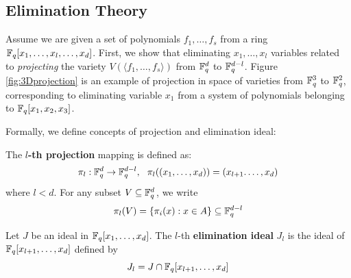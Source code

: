 \subsection{Elimination Theory}
Assume we are given a set of polynomials $f_1,\dots,f_s$ from a ring ${\mathbb{F}}_{q}[x_1,\dots,x_l,\dots,x_d]$.
First, we show that eliminating $x_1,\dots,x_l$ variables related to 
{\it projecting} the variety $V(\langle f_1,\dots,f_s\rangle)$ from 
${\mathbb{F}}_{q}^d$ to ${\mathbb{F}}_{q}^{d-l}$. Figure \ref{fig:3Dprojection} is an example of projection in space of varieties
from ${\mathbb{F}}_{q}^3$ to ${\mathbb{F}}_{q}^2$, corresponding to eliminating variable $x_1$ from 
a system of polynomials belonging to ${\mathbb{F}}_{q}[x_1,x_2,x_3]$.

\begin{figure}[bp]
\end{figure}

Formally, we define concepts of projection and elimination ideal:
\begin{Definition}
The {\bf $l$-th projection} mapping is defined as:
$$\pi_l:{\mathbb{F}}_{q}^d\to{\mathbb{F}}_{q}^{d-l},~~\pi_l((x_1,\dots,x_d)) = (x_{l+1}.\dots,x_d)$$
where $l<d$. For any subset $V \subseteq {\mathbb{F}}_{q}^d$, we write 
$$\pi_l(V) = \{\pi_i(x):x\in A\}\subseteq {\mathbb{F}}_{q}^{d-l}$$
\end{Definition}

\begin{Definition}
Let $J$ be an ideal in  ${\mathbb{F}}_{q}[x_1,\dots,x_d]$. The $l$-th 
{\bf elimination ideal} $J_l$ is the ideal of ${\mathbb{F}}_{q}[x_{l+1},\dots,x_d]$ defined
by
\begin{equation}
J_l = J \cap {\mathbb{F}}_{q}[x_{l+1},\dots,x_d]
\end{equation}
\end{Definition}

